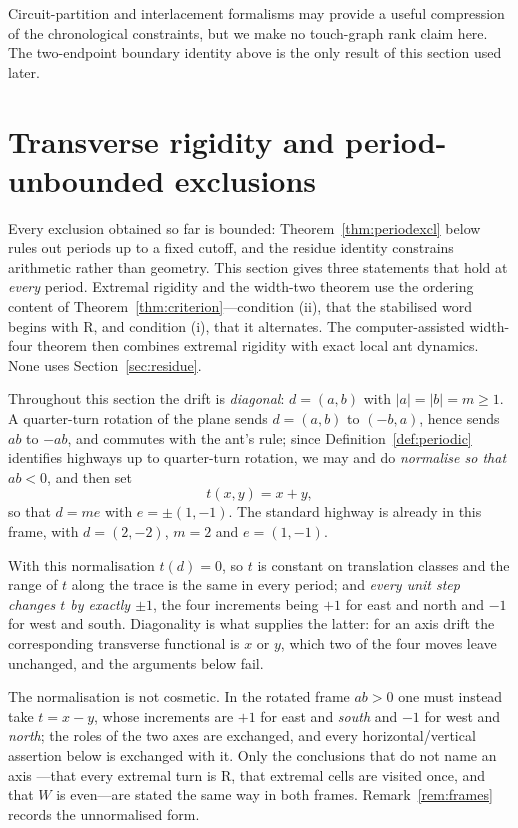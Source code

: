 \documentclass[11pt,reqno]{amsart}
\theoremstyle{plain}
\theoremstyle{definition}
\newcommand{\drift}{d}
\newcommand{\turnR}{\mathrm{R}}
\begin{document}
Circuit-partition and interlacement formalisms may provide a useful compression of
the chronological constraints, but we make no touch-graph rank claim here. The
two-endpoint boundary identity above is the only result of this section used later.

\section{Transverse rigidity and period-unbounded exclusions}\label{sec:transverse}

Every exclusion obtained so far is bounded: Theorem~\ref{thm:periodexcl} below rules
out periods up to a fixed cutoff, and the residue identity constrains arithmetic
rather than geometry. This section gives three statements that hold at \emph{every}
period. Extremal rigidity and the width-two theorem use the ordering content of
Theorem~\ref{thm:criterion}---condition (ii), that the stabilised word begins with
$\turnR$, and condition (i), that it alternates.  The computer-assisted width-four
theorem then combines extremal rigidity with exact local ant dynamics.  None uses
Section~\ref{sec:residue}.

Throughout this section the drift is \emph{diagonal}: $\drift=(a,b)$ with
$|a|=|b|=m\ge1$. A quarter-turn rotation of the plane sends $\drift=(a,b)$ to
$(-b,a)$, hence sends $ab$ to $-ab$, and commutes with the ant's rule; since
Definition~\ref{def:periodic} identifies highways up to quarter-turn rotation, we may
and do \emph{normalise so that $ab<0$}, and then set
\begin{equation}\label{eq:tfun}
t(x,y)=x+y,
\end{equation}
so that $\drift=m e$ with $e=\pm(1,-1)$. The standard highway is already in this
frame, with $\drift=(2,-2)$, $m=2$ and $e=(1,-1)$.

With this normalisation $t(\drift)=0$, so $t$ is constant on translation classes and
the range of $t$ along the trace is the same in every period; and \emph{every unit
step changes $t$ by exactly $\pm1$}, the four increments being $+1$ for east and
north and $-1$ for west and south. Diagonality is what supplies the latter: for an
axis drift the corresponding transverse functional is $x$ or $y$, which two of the
four moves leave unchanged, and the arguments below fail.

The normalisation is not cosmetic. In the rotated frame $ab>0$ one must instead take
$t=x-y$, whose increments are $+1$ for east and \emph{south} and $-1$ for west and
\emph{north}; the roles of the two axes are exchanged, and every horizontal/vertical
assertion below is exchanged with it. Only the conclusions that do not name an axis
---that every extremal turn is $\turnR$, that extremal cells are visited once, and
that $W$ is even---are stated the same way in both frames. Remark~\ref{rem:frames}
records the unnormalised form.
\end{document}
